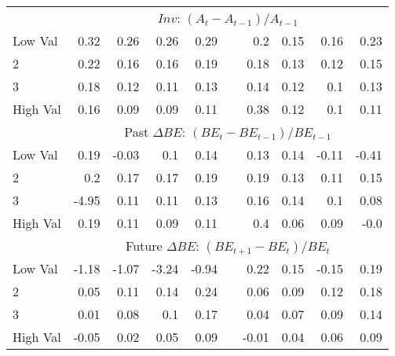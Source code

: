 \begin{tabular}{lrrrrlrrrr}
    & \multicolumn{9}{c}{$Inv$: $(A_t - A_{t-1}) / A_{t-1}$} \\
    Low Val    & 0.32  & 0.26  & 0.26  & 0.29  & & 0.2  & 0.15  & 0.16  & 0.23  \\
           2   & 0.22  & 0.16  & 0.16  & 0.19  & & 0.18  & 0.13  & 0.12  & 0.15  \\
           3   & 0.18  & 0.12  & 0.11  & 0.13  & & 0.14  & 0.12  & 0.1  & 0.13  \\
    High Val   & 0.16  & 0.09  & 0.09  & 0.11  & & 0.38  & 0.12  & 0.1  & 0.11  \\
    [1em]
  

    & \multicolumn{9}{c}{Past $\Delta BE$: $(BE_t - BE_{t-1}) / BE_{t-1}$} \\
    Low Val    & 0.19  & -0.03  & 0.1  & 0.14  & & 0.13  & 0.14  & -0.11  & -0.41  \\
           2   & 0.2  & 0.17  & 0.17  & 0.19  & & 0.19  & 0.13  & 0.11  & 0.15  \\
           3   & -4.95  & 0.11  & 0.11  & 0.13  & & 0.16  & 0.14  & 0.1  & 0.08  \\
    High Val   & 0.19  & 0.11  & 0.09  & 0.11  & & 0.4  & 0.06  & 0.09  & -0.0  \\
    [1em]
  

    & \multicolumn{9}{c}{Future $\Delta BE$: $(BE_{t+1} - BE_t) / BE_t$} \\
    Low Val    & -1.18  & -1.07  & -3.24  & -0.94  & & 0.22  & 0.15  & -0.15  & 0.19  \\
           2   & 0.05  & 0.11  & 0.14  & 0.24  & & 0.06  & 0.09  & 0.12  & 0.18  \\
           3   & 0.01  & 0.08  & 0.1  & 0.17  & & 0.04  & 0.07  & 0.09  & 0.14  \\
    High Val   & -0.05  & 0.02  & 0.05  & 0.09  & & -0.01  & 0.04  & 0.06  & 0.09  \\
    [1em]
  

  \bottomrule
\end{tabular}